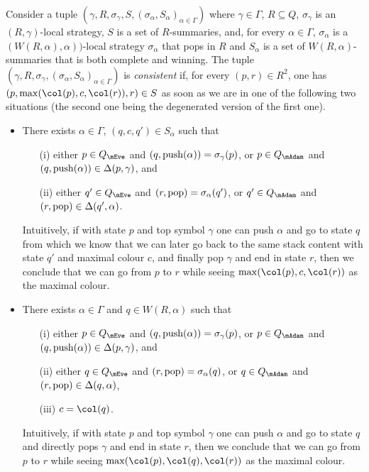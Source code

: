 Consider a tuple $(\gamma,R,\sigma_\gamma,S,(\sigma_\alpha,S_\alpha)_{\alpha\in\Gamma})$ where $\gamma\in\Gamma$, $R\subseteq Q$, $\sigma_\gamma$ is an $(R,\gamma)$-local strategy, $S$ is a set of $R$-summaries, and, for every $\alpha\in\Gamma$, $\sigma_\alpha$ is a $(W(R,\alpha),\alpha))$-local strategy $\sigma_\alpha$ that pops in $R$ and $S_\alpha$ is a set of $W(R,\alpha)$-summaries that is both complete and winning. The tuple $(\gamma,R,\sigma_\gamma,(\sigma_\alpha,S_\alpha)_{\alpha\in\Gamma})$ is \emph{consistent} if, for every $(p,r)\in R^2$, one has $(p,\max(\pdscol{p},c,\pdscol{r}),r)\in S$ as soon as we are in one of the following  two situations (the second one being the degenerated version of the first one).
\begin{itemize}
\item There exists $\alpha\in\Gamma$, $(q,c,q')\in S_\alpha$ such that
\begin{enumerate}
	\item[(i)] either $p\in Q_\mEve$ and $(q,\mathrm{push}(\alpha))=\sigma_\gamma(p)$, or $p\in Q_\mAdam$ and $(q,\mathrm{push}(\alpha))\in \Delta(p,\gamma)$, and 
	\item[(ii)] either $q'\in Q_\mEve$ and $(r,\mathrm{pop})=\sigma_\alpha(q')$, or $q'\in Q_\mAdam$ and $(r,\mathrm{pop})\in \Delta(q',\alpha)$.
\end{enumerate}
Intuitively, if with state $p$ and top symbol $\gamma$ one can push $\alpha$ and go to state $q$ from which we know that we can later go back to the same stack content with state $q'$ and maximal colour $c$, and finally pop $\gamma$ and end in state $r$, then we conclude that we can go from $p$ to $r$ while seeing $\max(\pdscol{p},c,\pdscol{r})$ as the maximal colour.
\item There exists $\alpha\in\Gamma$ and $q\in W(R,\alpha)$ such that
\begin{enumerate}
	\item[(i)] either $p\in Q_\mEve$ and $(q,\mathrm{push}(\alpha))=\sigma_\gamma(p)$, or $p\in Q_\mAdam$ and $(q,\mathrm{push}(\alpha))\in \Delta(p,\gamma)$, and 
	\item[(ii)] either $q\in Q_\mEve$ and $(r,\mathrm{pop})=\sigma_\alpha(q)$, or $q\in Q_\mAdam$ and $(r,\mathrm{pop})\in \Delta(q,\alpha)$,
	\item[(iii)] $c=\pdscol{q}$.
\end{enumerate}
Intuitively, if with state $p$ and top symbol $\gamma$ one can push $\alpha$ and go to state $q$ and directly pops $\gamma$ and end in state $r$, then we conclude that we can go from $p$ to $r$ while seeing $\max(\pdscol{p},\pdscol{q},\pdscol{r})$ as the maximal colour.
\end{itemize}

